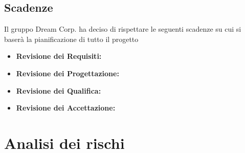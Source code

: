 \documentclass[12pt]{article}
\begin{document}
		\subsection{Scadenze}
			Il gruppo Dream Corp. ha deciso di rispettare le seguenti scadenze su cui si baserà la pianificazione di tutto il progetto
			\begin{itemize}
				\item \textbf{Revisione dei Requisiti:} 
				\item \textbf{Revisione dei Progettazione:} 
				\item \textbf{Revisione dei Qualifica:} 
				\item \textbf{Revisione dei Accettazione:} 
			\end{itemize}



	\newpage

	\section{Analisi dei rischi}
\end{document}
